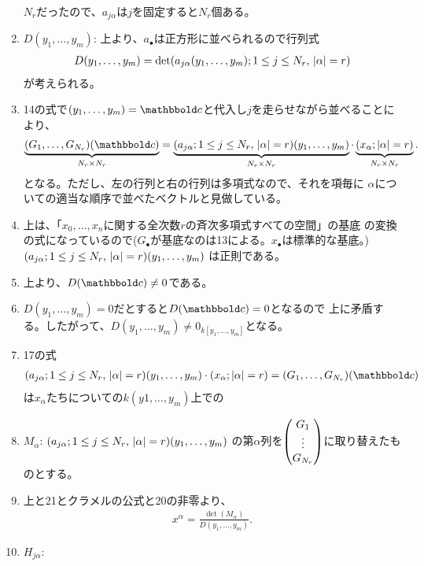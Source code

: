 \begin{myproof}
\begin{enumerate}
    $N_r$だったので、$a_{j\alpha}$は$j$を固定すると$N_r$個ある。
    \item $D(y_1,\dots,y_m)$:
    上より、$a_\bullet$は正方形に並べられるので行列式
    \begin{align}
      D(y_1,\dots,y_m) =
      \det(a_{j\alpha}(y_1,\dots,y_m); 1\le j \le N_r,\, \left|\alpha\right|=r)
    \end{align}
    が考えられる。
    \item
    14の式で$(y_1,\dots,y_m)=\bbold c$と代入し$j$を走らせながら並べることにより、
    \begin{align}
    \ub{(G_1, \dots ,G_{N_r})(\bbold c)}_{N_r \times N_r}
    =
    \ub{(a_{j\alpha}; 1\le j\le N_r, \, \myabs{\alpha}=r)(y_1,\dots,y_m)}_{N_r \times N_r}
    \cdot
    \ub{(x_\alpha; \myabs{\alpha}=r)}_{N_r \times N_r}.
    \end{align}
    となる。ただし、左の行列と右の行列は多項式なので、それを項毎に
    $\alpha$についての適当な順序で並べたベクトルと見做している。
    \item
    上は、「$x_0,\dots,x_n$に関する全次数$r$の斉次多項式すべての空間」の基底
    の変換の式になっているので($G_\bullet$が基底なのは13による。$x_\bullet$は標準的な基底。)
    $(a_{j\alpha}; 1\le j\le N_r, \, \left|\alpha\right|=r)(y_1,\dots,y_m)$
    は正則である。
    \item
    上より、$D(\bbold c)\neq 0$である。
    \item
    $D(y_1,\dots,y_m) = 0$だとすると$D(\bbold c) = 0$となるので
    上に矛盾する。したがって、$D(y_1,\dots,y_m) \neq 0_{k[y_1,\dots,y_m]}$となる。
    \item
    17の式
    \begin{align}
      {(a_{j\alpha}; 1\le j\le N_r, \, \myabs{\alpha}=r)(y_1,\dots,y_m)}
      \cdot
      {(x_\alpha; \myabs{\alpha}=r)}
      =
      {(G_1, \dots ,G_{N_r})(\bbold c)}
    \end{align}
    は$x_\alpha$たちについての$k(y1,\dots,y_m)$上での
    \item $M_\alpha$:
    ${(a_{j\alpha}; 1\le j\le N_r, \, \left|\alpha\right|=r)(y_1,\dots,y_m)}$
    の第$\alpha$列を$\left(\begin{matrix} G_1 \\ \vdots \\ G_{N_r} \end{matrix}\right)$に取り替えたものとする。
    \item 上と21とクラメルの公式と20の非零より、
    \begin{align}
      x^\alpha = \frac{\det(M_\alpha)}{D(y_1,\dots,y_m)}.
    \end{align}
    \item $H_{j\alpha}$:

\end{enumerate}
\end{myproof}
